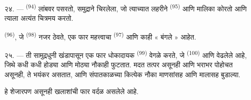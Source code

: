 \VUsaut{3.0mm}
\VUsaut{3.0mm}

२४. ---  \textsuperscript{(94)} लांबवर पसरतो, समुद्राने चिरलेला, जो
त्याच्यात लहरीने  \textsuperscript{(95)} आणि  मालिका
कोरतो आणि त्याला अत्यंत चित्रमय करतो.

 \textsuperscript{(96)}, जे  \textsuperscript{(98)} नजर
ठेवते, एक फार महत्त्वाचा  \textsuperscript{(97)} आणि काही « बंगले » आहेत.

२५. --- ती सामुद्रधुनी खंडापासून एक फार धोकादायक  \textsuperscript{(99)} वेगळे
करते, जे  \textsuperscript{(100)} आणि  वेढलेले आहे,
जिथे कधी कधी होड्या आणि मोठ्या नौकाही फुटतात. मदत तत्पर असूनही आणि  भराभर
पोहोचत असूनही, ते  भयंकर असतात, आणि संपातकाळच्या  कित्येक नौका
माणसांसह आणि मालासह बुडाल्या.

हे शेजारपण असूनही  खलाशांची फार वर्दळ असलेले आहे.

\VUsaut{6.0mm}
\VUfilet{22mm}

